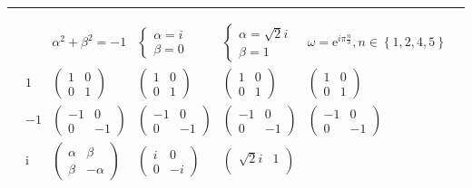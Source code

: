 \documentclass[
]{book}
\theoremstyle{definition}
\theoremstyle{definition}
\theoremstyle{definition}
\theoremstyle{definition}
\theoremstyle{remark}
\begin{document}
\begin{center}\rule{0.5\linewidth}{0.5pt}\end{center}

\[
\begin{array}{ccccc}
 & \alpha^{2}+\beta^{2}=-1 & \begin{cases}
\alpha=i\\
\beta=0
\end{cases} & \begin{cases}
\alpha=\sqrt{2}i\\
\beta=1
\end{cases} & \omega=\mathrm{e}^{i\pi\frac{n}{3}},n\in\left\{ 1,2,4,5\right\} \\
1 & \begin{pmatrix}1 & 0\\
0 & 1
\end{pmatrix} & \begin{pmatrix}1 & 0\\
0 & 1
\end{pmatrix} & \begin{pmatrix}1 & 0\\
0 & 1
\end{pmatrix} & \begin{pmatrix}1 & 0\\
0 & 1
\end{pmatrix}\\
-1 & \begin{pmatrix}-1 & 0\\
0 & -1
\end{pmatrix} & \begin{pmatrix}-1 & 0\\
0 & -1
\end{pmatrix} & \begin{pmatrix}-1 & 0\\
0 & -1
\end{pmatrix} & \begin{pmatrix}-1 & 0\\
0 & -1
\end{pmatrix}\\
\mathrm{i} & \begin{pmatrix}\alpha & \beta\\
\beta & -\alpha
\end{pmatrix} & \begin{pmatrix}i & 0\\
0 & -i
\end{pmatrix} & \begin{pmatrix}\sqrt{2}i & 1\\

\end{pmatrix}
\end{array}\]
\end{document}

